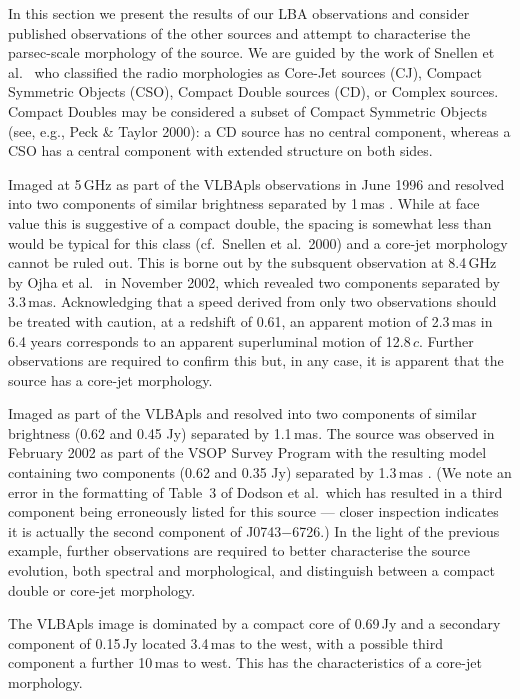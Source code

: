 \documentclass{pasa}%
\begin{document}
In this section we present the results of our LBA observations and consider
published observations of the other sources and attempt to characterise
the parsec-scale morphology of the source.
We are guided by the work of 
Snellen et al.\ 
who classified the radio morphologies as
Core-Jet sources (CJ),
Compact Symmetric Objects (CSO),
Compact Double sources (CD),
or Complex sources.
Compact Doubles may be considered a subset of Compact Symmetric Objects
(see, e.g., Peck \& Taylor 2000): a CD source has no central component,
whereas a CSO has a central component with extended structure on both sides.


Imaged at 5\,GHz as part of the VLBApls observations in June 1996 and
resolved into two components of similar brightness separated by 1\,mas
\cite{fom00}.
While at face value this is suggestive of a compact
double, the spacing is somewhat less than would be typical for this
class (cf.\ Snellen et al.\ 2000) and a core-jet morphology cannot be ruled out.
This is borne out by the subsquent observation at 8.4\,GHz by
Ojha et al.\  in November 2002, which revealed two
components separated by 3.3\,mas.  Acknowledging that a speed derived
from only two observations should be treated with caution, at a
redshift of 0.61, an apparent motion of 2.3\,mas in 6.4 years
corresponds to an apparent superluminal motion of 12.8\,$c$.  Further
observations are required to confirm this but, in any case, it is
apparent that the source has a core-jet morphology.


Imaged as part of the VLBApls \cite{fom00} and resolved into two
components of similar brightness (0.62 and 0.45 Jy) separated by
1.1\,mas.  The source was observed in February 2002 as part of the VSOP
Survey Program with the resulting model containing two components
(0.62 and 0.35 Jy) separated by 1.3\,mas \cite{dod08}.  (We note an
error in the formatting of Table~3 of Dodson et al.\ which has
resulted in a third component being erroneously listed for this source
--- closer inspection indicates it is actually the second component of
J0743$-$6726.)  In the light of the previous example, further
observations are required to better characterise the source evolution,
both spectral and morphological, and distinguish between a compact double or
core-jet morphology.

The VLBApls image \cite{fom00} is dominated by a compact core of
0.69\,Jy and a secondary component of 0.15\,Jy located 3.4\,mas to the
west, with a possible third component a further 10\,mas to west. This
has the characteristics of a core-jet morphology.
\end{document}
